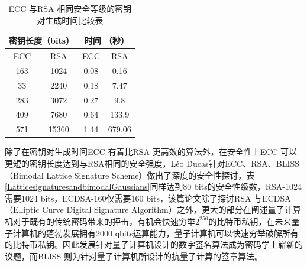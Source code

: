 				\begin{table}[!htb]
				\centering
				\caption{ECC 与RSA 相同安全等级的密钥对生成时间比较表\supercite{Performancecomparisonofellipticcurveandrsadigitalsignatures}}
				\label{ECCtime}
				\begin{tabular}{|c|c|c|c|}
				\hline
				\multicolumn{2}{|c|}{密钥长度（bits）} & \multicolumn{2}{c|}{时间 （秒）} \\ \hline
				ECC & RSA & ECC & RSA \\ \hline
				163 & 1024 & 0.08 & 0.16 \\ \hline
				33 & 2240 & 0.18 & 7.47 \\ \hline
				283 & 3072 & 0.27 & 9.8 \\ \hline
				409 & 7680 & 0.64 & 133.9 \\ \hline
				571 & 15360 & 1.44 & 679.06 \\ \hline
				\end{tabular}
				\end{table}	

				除了在密钥对生成时间ECC 有着比RSA 更高效的算法外，在安全性上ECC 可以更短的密钥长度达到与RSA相同的安全强度，Léo Ducas针对ECC、RSA、BLISS（Bimodal Lattice Signature Scheme）\supercite{LatticesignaturesandbimodalGaussians}做出了深度的安全性探讨，表\ref{LatticesignaturesandbimodalGaussians}同样达到80 bits的安全性级数，RSA-1024需要1024 bits，ECDSA-160\supercite{DeploymentsofEllipticCurveCryptography}仅需要160 bits，该篇论文除了探讨RSA 与ECDSA（Elliptic Curve Digital Signature Algorithm）之外，更大的部分在阐述量子计算机对于既有的传统密码带来的抨击，有机会快速穷举$2^{256}$的比特币私钥，在未来量子计算机的蓬勃发展拥有2000 qbits运算能力，量子计算机可以快速穷举破解所有的比特币私钥。因此发展针对量子计算机设计的数字签名算法成为密码学上崭新的议题，而BLISS 则为针对量子计算机所设计的抗量子计算的签章算法。

